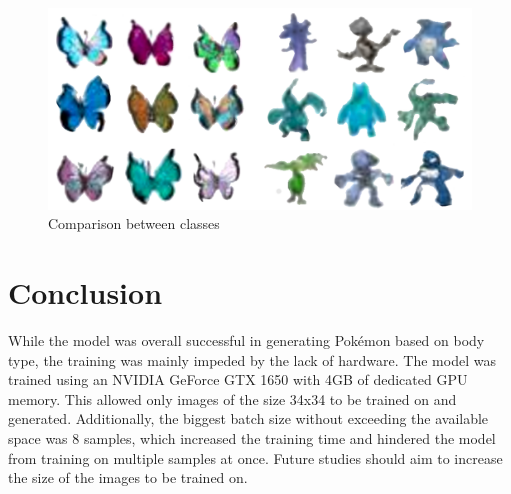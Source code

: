 \documentclass[12pt]{article}
\theoremstyle{plain}
\theoremstyle{definition}
\theoremstyle{remark}
\begin{document}
\begin{figure}[H]
	\centering
	\includegraphics[width=0.9\linewidth]{src/Images/category_comparison}
	\caption[Class Comparison]{Comparison between classes}
	\label{fig:categorycomparison}
\end{figure}

\section{Conclusion}
\label{sec:conclusion}

While the model was overall successful in generating Pokémon based on body type, the training was mainly impeded by the lack of hardware. The model was trained using an NVIDIA GeForce GTX 1650 with 4GB of dedicated GPU memory. This allowed only images of the size 34x34 to be trained on and generated. Additionally, the biggest batch size without exceeding the available space was 8 samples, which increased the training time and hindered the model from training on multiple samples at once. Future studies should aim to increase the size of the images to be trained on.

%
%
\newpage
\printbibliography[heading=bibintoc]
\end{document}
